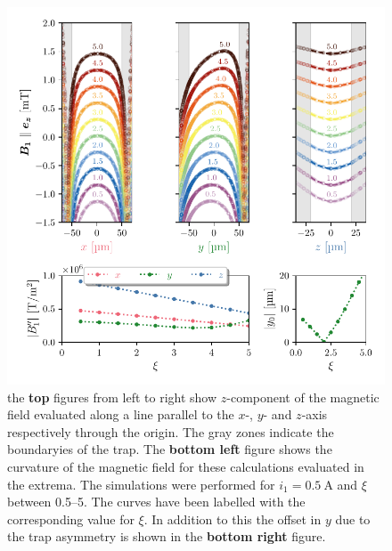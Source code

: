 \begin{figure}
    \centering
    \includegraphics{figures/data/magnetic_field_curvature.pdf}
    \caption{the \textbf{top} figures from left to right show $z$-component of the magnetic field evaluated along a line parallel to the $x$-, $y$- and $z$-axis respectively through the origin. The gray zones indicate the boundaryies of the trap. The \textbf{bottom left} figure shows the curvature of the magnetic field for these calculations evaluated in the extrema. The simulations were performed for $i_1=\qty{0.5}{\ampere}$ and $\xi$ between \numrange{0.5}{5}. The curves have been labelled with the corresponding value for $\xi$. In addition to this the offset in $y$ due to the trap asymmetry is shown in the \textbf{bottom right} figure.}
    \label{fig:magnetic-field-curvature}
\end{figure}

